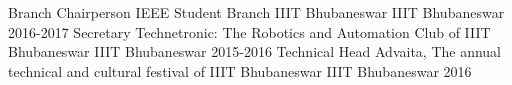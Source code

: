 \begin{cvhonors}
  \cvhonor
    {Branch Chairperson}
    {IEEE Student Branch IIIT Bhubaneswar}
    {IIIT Bhubaneswar}
    {2016-2017}
  \cvhonor
    {Secretary}
    {Technetronic: The Robotics and Automation Club of IIIT Bhubaneswar}
    {IIIT Bhubaneswar}
    {2015-2016}
  \cvhonor
    {Technical Head}
    {Advaita, The annual technical and cultural festival of IIIT Bhubaneswar}
    {IIIT Bhubaneswar}
    {2016}
\end{cvhonors}

